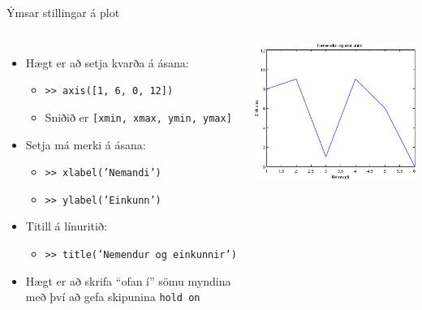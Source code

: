 \documentclass{beamer}
\begin{document}
\begin{frame}{Ýmsar stillingar á plot}
    \begin{columns}
        \begin{itemize}
            \item Hægt er að setja kvarða á ásana:
            \begin{itemize}
                \item \texttt{>> axis([1, 6, 0, 12])}
                \item Sniðið er \texttt{[xmin, xmax, ymin, ymax]}
            \end{itemize}
            \item Setja má merki á ásana:
            \begin{itemize}
                \item \texttt{>> xlabel('Nemandi')}
                \item \texttt{>> ylabel('Einkunn')}
            \end{itemize}
            \item Titill á línuritið:
            \begin{itemize}
                \item \texttt{>> title('Nemendur og einkunnir')}
            \end{itemize}
            \item Hægt er að skrifa ``ofan í'' sömu myndina með því að gefa skipunina \texttt{hold on} 
        \end{itemize}
        
        \includegraphics[width=\linewidth]{../T1a/Pics/plot-example6}
    \end{columns}
\end{frame}
    
\end{document}
